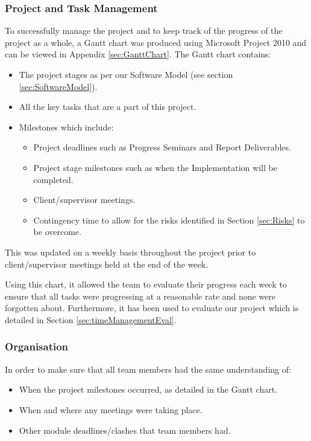 \subsubsection{Project and Task Management}
To successfully manage the project and to keep track of the progress of the project as a whole, a Gantt chart was produced using Microsoft Project 2010 and can be viewed in Appendix \ref{sec:GanttChart}. The Gantt chart contains:
\begin{itemize}
	\item{The project stages as per our Software Model (see section \ref{sec:SoftwareModel}).}
	\item{All the key tasks that are a part of this project.}
	\item{Milestones which include:}
	\begin{itemize}
		\item{Project deadlines such as Progress Seminars and Report Deliverables.}
		\item{Project stage milestones such as when the Implementation will be completed.}
		\item{Client/supervisor meetings.}
		\item{Contingency time to allow for the risks identified in Section \ref{sec:Risks} to be overcome.}
	\end{itemize}
\end{itemize}

This was updated on a weekly basis throughout the project prior to client/supervisor meetings held at the end of the week.

Using this chart, it allowed the team to evaluate their progress each week to ensure that all tasks were progressing at 
a reasonable rate and none were forgotten about. Furthermore, it has been used to evaluate our project which is detailed 
in Section \ref{sec:timeManagementEval}.

\subsubsection{Organisation}
In order to make sure that all team members had the same understanding of:
\begin{itemize}
	\item{When the project milestones occurred, as detailed in the Gantt chart.}
	\item{When and where any meetings were taking place.}
	\item{Other module deadlines/clashes that team members had.}
\end{itemize}


